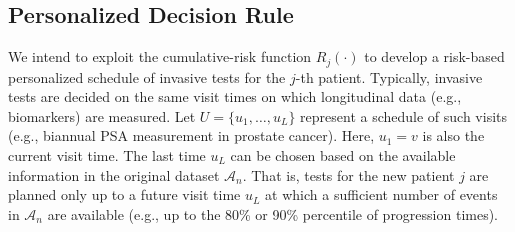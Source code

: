 \subsection{Personalized Decision Rule} 
\label{subsec:pers_schedule}
We intend to exploit the cumulative-risk function $R_j(\cdot)$ to develop a risk-based personalized schedule of invasive tests for the $j$-th patient. Typically, invasive tests are decided on the same visit times on which longitudinal data (e.g., biomarkers) are measured. Let $U = \{u_1, \ldots, u_L\}$ represent a schedule of such visits (e.g., biannual PSA measurement in prostate cancer).  Here, $u_1 = v$ is also the current visit time. The last time $u_L$ can be chosen based on the available information in the original dataset $\mathcal A_n$. That is, tests for the new patient $j$ are planned only up to a future visit time $u_L$ at which a sufficient number of events in $\mathcal A_n$ are available (e.g., up to the 80\% or 90\% percentile of progression times).

